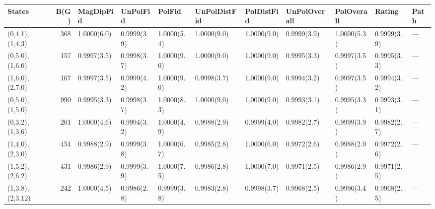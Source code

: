\begin{tabular}{lrlllllllll}
\hline
 States           &   B(G) & MagDipFid   & UnPolFid    & PolFid      & UnPolDistFid   & PolDistFid   & UnPolOverall   & PolOverall   & Rating      & Path   \\
\hline
 (0,4,1),(1,4,3)  &    368 & 1.0000(6.0) & 0.9999(3.9) & 1.0000(5.4) & 1.0000(9.0)    & 1.0000(9.0)  & 0.9999(3.9)    & 1.0000(5.3)  & 0.9999(3.9) & ---    \\
 (0,5,0),(1,6,0)  &    157 & 0.9997(3.5) & 0.9998(3.7) & 1.0000(9.0) & 1.0000(9.0)    & 1.0000(9.0)  & 0.9995(3.3)    & 0.9997(3.5)  & 0.9995(3.3) & ---    \\
 (1,6,0),(2,7,0)  &    167 & 0.9997(3.5) & 0.9999(4.2) & 1.0000(9.0) & 0.9998(3.7)    & 1.0000(9.0)  & 0.9994(3.2)    & 0.9997(3.5)  & 0.9994(3.2) & ---    \\
 (0,5,0),(1,5,0)  &    990 & 0.9995(3.3) & 0.9998(3.7) & 1.0000(8.3) & 1.0000(9.0)    & 1.0000(9.0)  & 0.9993(3.1)    & 0.9995(3.3)  & 0.9993(3.1) & ---    \\
 (0,3,2),(1,3,6)  &    201 & 1.0000(4.6) & 0.9994(3.2) & 1.0000(4.9) & 0.9988(2.9)    & 0.9999(4.0)  & 0.9982(2.7)    & 0.9999(3.9)  & 0.9982(2.7) & ---    \\
 (1,4,0),(2,3,0)  &    454 & 0.9988(2.9) & 0.9999(3.8) & 1.0000(6.7) & 0.9985(2.8)    & 1.0000(6.0)  & 0.9972(2.6)    & 0.9988(2.9)  & 0.9972(2.6) & ---    \\
 (1,5,2),(2,6,2)  &    431 & 0.9986(2.9) & 0.9999(3.9) & 1.0000(7.5) & 0.9986(2.8)    & 1.0000(7.0)  & 0.9971(2.5)    & 0.9986(2.9)  & 0.9971(2.5) & ---    \\
 (1,3,8),(2,3,12) &    242 & 1.0000(4.5) & 0.9986(2.8) & 0.9999(3.8) & 0.9983(2.8)    & 0.9998(3.7)  & 0.9968(2.5)    & 0.9996(3.4)  & 0.9968(2.5) & ---    \\
\hline
\end{tabular}
